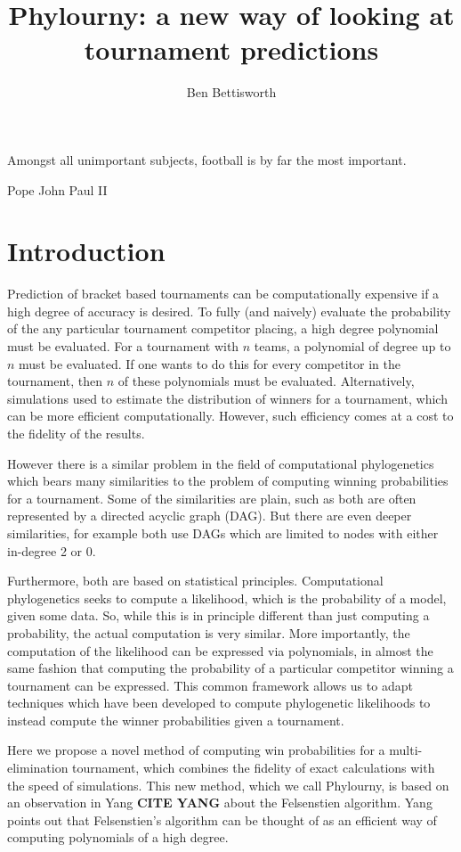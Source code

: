 \documentclass{article}
\title{Phylourny: a new way of looking at tournament predictions}
\author{Ben Bettisworth}
\begin{document}
\newcommand{\beats}[2]{P_{#1 \vdash #2}}

\maketitle
\epigraph{Amongst all unimportant subjects, football is by far the most important.}{Pope John Paul II}
\section{Introduction}

Prediction of bracket based tournaments can be computationally expensive if a high degree of accuracy is desired. To
fully (and naively) evaluate the probability of the any particular tournament competitor placing, a high degree
polynomial must be evaluated. For a tournament with $n$ teams, a polynomial of degree up to $n$ must be evaluated. If
one wants to do this for every competitor in the tournament, then $n$ of these polynomials must be evaluated.
Alternatively, simulations used to estimate the distribution of winners for a tournament, which can be more efficient
computationally. However, such efficiency comes at a cost to the fidelity of the results.

However there is a similar problem in the field of computational phylogenetics which bears many similarities to the
problem of computing winning probabilities for a tournament. Some of the similarities are plain, such as both are often 
represented by a directed acyclic graph (DAG). But there are even deeper similarities, for example both use DAGs which
are limited to nodes with either in-degree 2 or 0.

Furthermore, both are based on statistical principles. Computational phylogenetics seeks to compute a likelihood, which
is the probability of a model, given some data. So, while this is in principle different than just computing a
probability, the actual computation is very similar. More importantly, the computation of the likelihood can be
expressed via polynomials, in almost the same fashion that computing the probability of a particular competitor winning a
tournament can be expressed. This common framework allows us to adapt techniques which have been developed to compute
phylogenetic likelihoods to instead compute the winner probabilities given a tournament.

Here we propose a novel method of computing win probabilities for a multi-elimination tournament, which combines the
fidelity of exact calculations with the speed of simulations. This new method, which we call Phylourny, is based on an
observation in Yang \textbf{CITE YANG} about the Felsenstien algorithm. Yang points out that Felsenstien's algorithm can
be thought of as an efficient way of computing polynomials of a high degree. 
\end{document}
